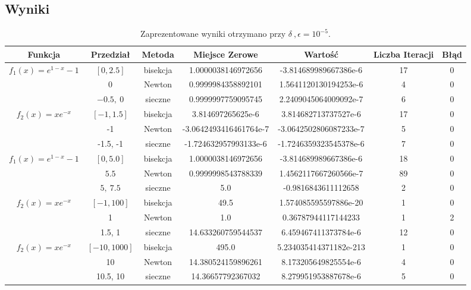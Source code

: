 \documentclass[]{article}
\begin{document}
\subsection{Wyniki}
\begin{table}[h]
	\centering
	\begin{tabular}{||c c c c c c c||} 
		\hline
		Funkcja & Przedział & Metoda & Miejsce Zerowe & Wartość & Liczba Iteracji & Błąd \\ [0.5ex] 
		\hline\hline
		\multirow{3}{*}{$f_1(x) = e^{1-x}-1$} &
		$[0, 2.5]$ & bisekcja & 1.0000038146972656 & -3.814689989667386e-6 & 17 & 0\\
		&$0$ & Newton & 0.9999984358892101 & 1.5641120130194253e-6 & 4 & 0\\
		&$-0.5,\: 0 $ & sieczne & 0.9999997759095745 & 2.2409045064009092e-7&
		 6 & 0\\
		\multirow{3}{*}{$f_2(x) = xe^{-x}$} &
		$[-1, 1.5]$ & bisekcja & 3.814697265625e-6 & 3.814682713737527e-6 & 17 & 0\\
		&-1 & Newton & -3.0642493416461764e-7 & -3.0642502806087233e-7 & 5 &  0\\
		& -1.5, -1 & sieczne & -1.724632957993133e-6 & -1.7246359323545378e-6 & 7 & 0\\
		\hline
		\multirow{3}{*}{$f_1(x) = e^{1-x}-1$} &
		
		
		$[0, 5.0]$ & bisekcja & 1.0000038146972656 & -3.814689989667386e-6 & 18 & 0\\
		&$5.5$ & Newton & 0.9999998543788339 & 1.4562117667260566e-7 & 89 & 0\\
		&$5,\: 7.5 $ & sieczne & 5.0 & -0.9816843611112658 & 2 & 0\\
		\multirow{3}{*}{$f_2(x) = xe^{-x}$} &
		$[-1, 100]$ & bisekcja & 49.5 &  1.574085595597886e-20 & 1 & 0\\
		& 1 & Newton & 1.0 & 0.36787944117144233 & 1 &  2\\
		& 1.5, 1 & sieczne & 14.633260759544537 & 6.459467411373784e-6 & 12 & 0\\
		\hline
		\multirow{3}{*}{$f_2(x) = xe^{-x}$} &
		$[-10, 1000]$ & bisekcja & 495.0 &  5.234035414371182e-213 & 1 & 0\\
		& 10 & Newton & 14.380524159896261 & 8.173205649825554e-6 & 4 &  0\\
		& 10.5, 10 & sieczne & 14.36657792367032 &8.279951953887678e-6 & 5 & 0\\
		\hline
	\end{tabular}
	\caption{Zaprezentowane wyniki otrzymano przy $\delta\:,\epsilon = 10^{-5}$.}
\end{table}
\end{document}

